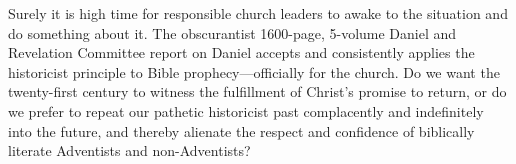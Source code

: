 Surely it is high time for responsible church leaders to awake to the
situation and do something about it. The obscurantist 1600-page, 5-volume
Daniel and Revelation Committee report on Daniel accepts and consistently
applies the historicist principle to Bible prophecy---officially for the
church. Do we want the twenty-first century to witness the fulfillment of
Christ's promise to return, or do we prefer to repeat our pathetic
historicist past complacently and indefinitely into the future, and thereby
alienate the respect and confidence of biblically literate Adventists and
non-Adventists?
